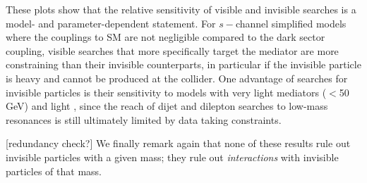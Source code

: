 

These plots show that the relative sensitivity of visible and invisible searches is a model- and parameter-dependent statement. For $s-$channel simplified models where the couplings to SM are not negligible compared to the dark sector coupling, visible searches that more specifically target the mediator are more constraining than their invisible counterparts, in particular if the invisible particle is heavy and cannot be produced at the collider. 
One advantage of searches for invisible particles is their sensitivity to models with very light mediators ($<$50 GeV) and light \mdm, since the reach of dijet and dilepton searches to low-mass resonances is still ultimately limited by data taking constraints. 

[redundancy check?]
We finally remark again that none of these results rule out invisible particles with a given mass; they rule out {\it interactions} with invisible particles of that mass.


